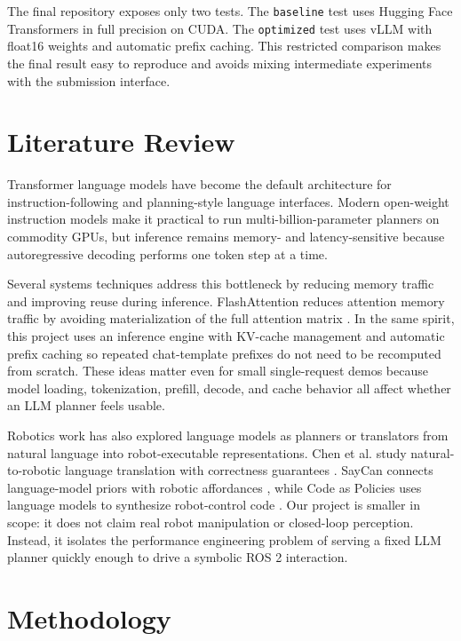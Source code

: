 \documentclass[conference]{IEEEtran}
\begin{document}
The final repository exposes only two tests. The \texttt{baseline} test uses Hugging Face Transformers in full precision on CUDA. The \texttt{optimized} test uses vLLM with float16 weights and automatic prefix caching. This restricted comparison makes the final result easy to reproduce and avoids mixing intermediate experiments with the submission interface.

\section{Literature Review}

Transformer language models \cite{vaswani2017attention} have become the default architecture for instruction-following and planning-style language interfaces. Modern open-weight instruction models make it practical to run multi-billion-parameter planners on commodity GPUs, but inference remains memory- and latency-sensitive because autoregressive decoding performs one token step at a time.

Several systems techniques address this bottleneck by reducing memory traffic and improving reuse during inference. FlashAttention reduces attention memory traffic by avoiding materialization of the full attention matrix \cite{dao2022flashattention}. In the same spirit, this project uses an inference engine with KV-cache management and automatic prefix caching so repeated chat-template prefixes do not need to be recomputed from scratch. These ideas matter even for small single-request demos because model loading, tokenization, prefill, decode, and cache behavior all affect whether an LLM planner feels usable.

Robotics work has also explored language models as planners or translators from natural language into robot-executable representations. Chen et al. study natural-to-robotic language translation with correctness guarantees \cite{chen2025llmpowerednaturaltoroboticlanguagetranslation}. SayCan connects language-model priors with robotic affordances \cite{ahn2022saycan}, while Code as Policies uses language models to synthesize robot-control code \cite{liang2023code}. Our project is smaller in scope: it does not claim real robot manipulation or closed-loop perception. Instead, it isolates the performance engineering problem of serving a fixed LLM planner quickly enough to drive a symbolic ROS 2 interaction.


\section{Methodology}
\end{document}

